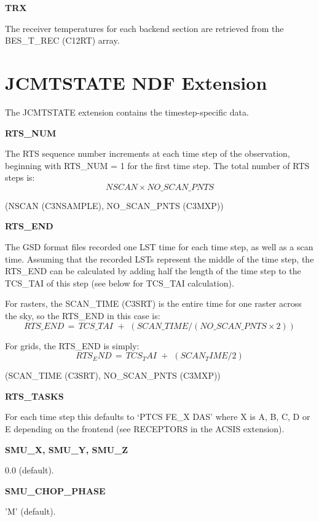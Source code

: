 \documentclass[twoside,11pt,nolof]{starlink}
\providecommand{\nScan}{NSCAN (C3NSAMPLE)}
\providecommand{\scanTime}{SCAN\_TIME (C3SRT)}
\providecommand{\nScanPts}{NO\_SCAN\_PNTS (C3MXP)}
\providecommand{\recTemps}{BES\_T\_REC (C12RT)}
\begin{document}
\textbf{TRX}

The receiver temperatures for each backend section are retrieved from the \recTemps{} array.

\section{JCMTSTATE NDF Extension}

The JCMTSTATE extension contains the timestep-specific data.

\textbf{RTS\_NUM}

The RTS sequence number increments at each time step of the observation, beginning with RTS\_NUM = 1 for the first time step.  The total number of RTS steps is:
\begin{equation}
NSCAN \times NO\_SCAN\_PNTS
\end{equation}

(\nScan, \nScanPts)

\textbf{RTS\_END}

The GSD format files recorded one LST time for each time step, as well as a scan time.  Assuming that the recorded LSTs represent the middle of the time step, the RTS\_END can be calculated by adding half the length of the time step to the TCS\_TAI of this step (see below for TCS\_TAI calculation).

For rasters, the \scanTime{} is the entire time for one raster across the sky, so the RTS\_END in this case is:
\begin{equation}
RTS\_END \,=\, TCS\_TAI \,\, + \,\, \left( SCAN\_TIME / \left( NO\_SCAN\_PNTS \times 2\right) \right)
\end{equation}

For grids, the RTS\_END is simply:
\begin{equation}
RTS _ END \,=\, TCS _ TAI \,\, + \,\, \left( SCAN _ TIME / 2 \right)
\end{equation}

(\scanTime, \nScanPts)

\textbf{RTS\_TASKS}

For each time step this defaults to `PTCS FE\_X DAS' where X is A, B, C, D or E depending on the frontend (see RECEPTORS in the ACSIS extension).

\textbf{SMU\_X, SMU\_Y, SMU\_Z}

0.0 (default).

\textbf{SMU\_CHOP\_PHASE}

'M' (default).
\end{document}
